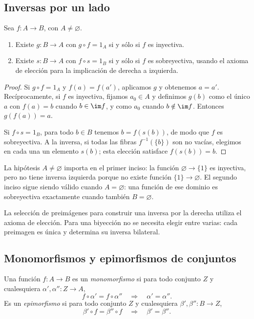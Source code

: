 \subsection{Inversas por un lado}
\begin{prop}\label{prop:C1-inversas}
Sea $f:A\to B$, con $A\ne\varnothing$.
\begin{enumerate}[label=\alph*)]
\item Existe $g:B\to A$ con $g\circ f=1_A$ si y sólo si $f$ es inyectiva.
\item Existe $s:B\to A$ con $f\circ s=1_B$ si y sólo si $f$ es sobreyectiva, usando el axioma de elección para la implicación de derecha a izquierda.
\end{enumerate}
\end{prop}
\begin{proof}
Si $g\circ f=1_A$ y $f(a)=f(a')$, aplicamos $g$ y obtenemos $a=a'$. Recíprocamente, si $f$ es inyectiva, fijamos $a_0\in A$ y definimos $g(b)$ como el único $a$ con $f(a)=b$ cuando $b\in\im f$, y como $a_0$ cuando $b\notin\im f$. Entonces $g(f(a))=a$.

Si $f\circ s=1_B$, para todo $b\in B$ tenemos $b=f(s(b))$, de modo que $f$ es sobreyectiva. A la inversa, si todas las fibras $f^{-1}(\{b\})$ son no vacías, elegimos en cada una un elemento $s(b)$; esta elección satisface $f(s(b))=b$.
\end{proof}

\begin{obs}
La hipótesis $A\ne\varnothing$ importa en el primer inciso: la función $\varnothing\to\{1\}$ es inyectiva, pero no tiene inversa izquierda porque no existe función $\{1\}\to\varnothing$. El segundo inciso sigue siendo válido cuando $A=\varnothing$: una función de ese dominio es sobreyectiva exactamente cuando también $B=\varnothing$.
\end{obs}
\begin{obs}
La selección de preimágenes para construir una inversa por la derecha utiliza el axioma de elección. Para una biyección no se necesita elegir entre varias: cada preimagen es única y determina su inversa bilateral.
\end{obs}

\subsection{Monomorfismos y epimorfismos de conjuntos}
\begin{defi}
Una función $f:A\to B$ es un \emph{monomorfismo} si para todo conjunto $Z$ y cualesquiera $\alpha',\alpha'':Z\to A$,
\[
f\circ\alpha'=f\circ\alpha''\quad\Rightarrow\quad\alpha'=\alpha''.
\]
Es un \emph{epimorfismo} si para todo conjunto $Z$ y cualesquiera $\beta',\beta'':B\to Z$,
\[
\beta'\circ f=\beta''\circ f\quad\Rightarrow\quad\beta'=\beta''.
\]
\end{defi}

